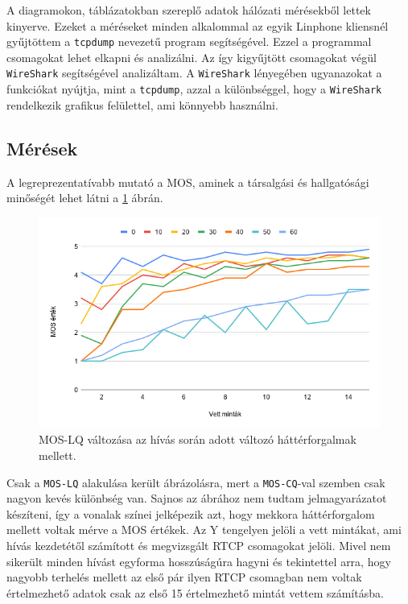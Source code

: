 A diagramokon, táblázatokban szereplő adatok hálózati mérésekből lettek kinyerve. Ezeket 
a méréseket minden alkalommal az egyik Linphone kliensnél gyűjtöttem a \texttt{tcpdump} 
nevezetű program segítségével. Ezzel a programmal csomagokat lehet elkapni és analizálni. 
Az így kigyűjtött csomagokat végül \texttt{WireShark} segítségével analizáltam. A 
\texttt{WireShark} lényegében ugyanazokat a funkciókat nyújtja, mint a \texttt{tcpdump}, 
azzal a különbséggel, hogy a \texttt{WireShark} rendelkezik grafikus felülettel, ami 
könnyebb használni. 

\subsection{Mérések}

A legreprezentatívabb mutató a MOS, aminek a társalgási és hallgatósági minőségét lehet 
látni a \ref{fig:moslq} ábrán.

\begin{figure}[!ht]
	\centering
	\includegraphics[width=1\textwidth, keepaspectratio]{figures/moslq.png}
	\caption{MOS-LQ változása az hívás során adott változó háttérforgalmak mellett.}
	\label{fig:moslq}
\end{figure}

Csak a \texttt{MOS-LQ} alakulása került ábrázolásra, mert a \texttt{MOS-CQ}-val szemben 
csak nagyon kevés különbség van. Sajnos az ábrához nem tudtam jelmagyarázatot készíteni, 
így a vonalak színei jelképezik azt, hogy mekkora háttérforgalom mellett voltak mérve a 
MOS értékek. Az Y tengelyen jelöli a vett mintákat, ami hívás kezdetétől számított és 
megvizsgált RTCP csomagokat jelöli. Mivel nem sikerült minden hívást egyforma 
hosszúságúra hagyni és tekintettel arra, hogy nagyobb terhelés mellett az első pár ilyen 
RTCP csomagban nem voltak értelmezhető adatok csak az első 15 értelmezhető mintát vettem 
számításba.

